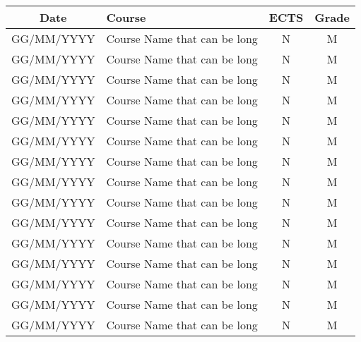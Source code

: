 \documentclass[10pt,a4paper,ragged2e]{maltacv}
\begin{document}

\bio{}

\makecvheader

\begin{center}
\begin{onehalfspace}
\begin{tabular}{ c m{9.5cm} c c }
  \textbf{Date} & \textbf{Course} & \textbf{ECTS} & \textbf{Grade}\\\hline
  GG/MM/YYYY & Course Name that can be long & N & M \\\hline
  GG/MM/YYYY & Course Name that can be long & N & M \\\hline
  GG/MM/YYYY & Course Name that can be long & N & M \\\hline
  GG/MM/YYYY & Course Name that can be long & N & M \\\hline
  GG/MM/YYYY & Course Name that can be long & N & M \\\hline
  GG/MM/YYYY & Course Name that can be long & N & M \\\hline
  GG/MM/YYYY & Course Name that can be long & N & M \\\hline
  GG/MM/YYYY & Course Name that can be long & N & M \\\hline
  GG/MM/YYYY & Course Name that can be long & N & M \\\hline
  GG/MM/YYYY & Course Name that can be long & N & M \\\hline
  GG/MM/YYYY & Course Name that can be long & N & M \\\hline
  GG/MM/YYYY & Course Name that can be long & N & M \\\hline
  GG/MM/YYYY & Course Name that can be long & N & M \\\hline
  GG/MM/YYYY & Course Name that can be long & N & M \\\hline
  GG/MM/YYYY & Course Name that can be long & N & M \\\hline

\end{tabular}
\end{onehalfspace}
\end{center}
\end{document}
